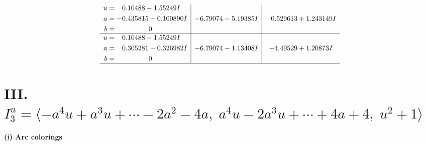 \documentclass[1p]{elsarticle_modified}
\theoremstyle{definition}
\begin{document}
$$\begin{array}{c|c|c}
\begin{aligned}
u &= \phantom{-}0.10488 - 1.55249 I \\
a &= -0.435815 - 0.100890 I \\
b &= \phantom{-0.000000 } 0\end{aligned}
 & -6.79074 - 5.19385 I & \phantom{-}0.529613 + 1.243149 I \\ \hline\begin{aligned}
u &= \phantom{-}0.10488 - 1.55249 I \\
a &= \phantom{-}0.305281 - 0.326982 I \\
b &= \phantom{-0.000000 } 0\end{aligned}
 & -6.79074 - 1.13408 I & -4.49529 + 1.20873 I\\
 \hline 
 \end{array}$$\newpage\newpage\renewcommand{\arraystretch}{1}
\centering \section*{III. $I^u_{3}= \langle - a^4 u+a^3 u+\cdots-2 a^2-4 a,\;a^4 u-2 a^3 u+\cdots+4 a+4,\;u^2+1 \rangle$}
\flushleft \textbf{(i) Arc colorings}\\
\end{document}
